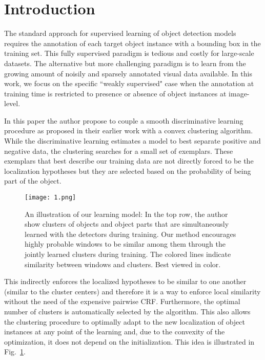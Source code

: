 \documentclass[10pt,twocolumn,letterpaper]{article}
\begin{document}
\section{Introduction}
The standard approach for supervised learning of object detection models requires the annotation of each target object instance with a bounding box in the training set. This fully supervised paradigm is tedious and costly for large-scale datasets. The alternative but more challenging paradigm is to learn from the growing amount of noisily and sparsely annotated visual data available\cite{Felzenszwalb2014Object}. In this work, we focus on the specific ``weakly supervised" case when the annotation at training time is restricted to presence or absence of object instances at image-level.
\par
In this paper the author propose to couple a smooth discriminative learning procedure as proposed in their earlier work with a convex clustering algorithm. While the discriminative learning estimates a model to best separate positive and negative data, the clustering searches for a small set of exemplars. These exemplars that best describe our training data are not directly forced to be the localization hypotheses but they are selected based on the probability of being part of the object.
\begin{figure}
\begin{center}
  \texttt{[image: 1.png]}\\
  \caption{An illustration of our learning model: In the top row, the author show clusters of objects and object parts that are simultaneously learned with the detectors during training. Our method encourages highly probable windows to be similar among them through the jointly learned clusters during training. The colored lines indicate similarity between windows and clusters. Best viewed in color.}\label{1}
\end{center}
\end{figure}
This indirectly enforces the localized hypotheses to be similar to one another (similar to the cluster centers) and therefore it is a way to enforce local similarity without the need of the expensive pairwise CRF. Furthermore, the optimal number of clusters is automatically selected by the algorithm. This also allows the clustering procedure to optimally adapt to the new localization of object instances at any point of the learning and, due to the convexity of the optimization, it does not depend on the initialization. This idea is illustrated in Fig.~\ref{1}.
\end{document}
